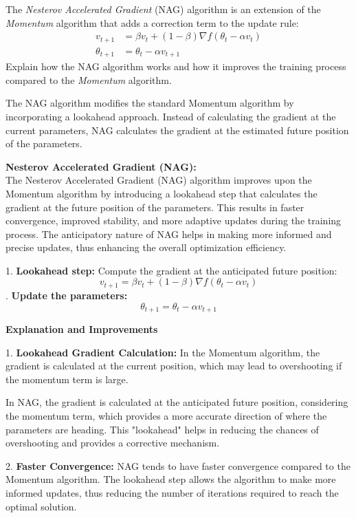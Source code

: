 The \textit{Nesterov Accelerated Gradient} (NAG) algorithm is an extension of the \textit{Momentum} algorithm that adds a correction term to the update rule:
\[
\begin{aligned}
v_{t+1} &= \beta v_t + (1 - \beta) \nabla f(\theta_t - \alpha v_t) \\
\theta_{t+1} &= \theta_t - \alpha v_{t+1}
\end{aligned}
\]
Explain how the NAG algorithm works and how it improves the training process compared to the \textit{Momentum} algorithm.
\begin{qsolve}
    \begin{qsolve}[]
        The NAG algorithm modifies the standard Momentum algorithm by incorporating a lookahead approach. Instead of calculating the gradient at the current parameters, NAG calculates the gradient at the estimated future position of the parameters.

\textbf{Nesterov Accelerated Gradient (NAG):} \\
The Nesterov Accelerated Gradient (NAG) algorithm improves upon the Momentum algorithm by introducing a lookahead step that calculates the gradient at the future position of the parameters. This results in faster convergence, improved stability, and more adaptive updates during the training process. The anticipatory nature of NAG helps in making more informed and precise updates, thus enhancing the overall optimization efficiency.

1. \textbf{Lookahead step:} Compute the gradient at the anticipated future position:
\[
v_{t+1} = \beta v_t + (1 - \beta) \nabla f(\theta_t - \alpha v_t)
\]
. \textbf{Update the parameters:}
\[
\theta_{t+1} = \theta_t - \alpha v_{t+1}
\]

\textbf{Explanation and Improvements}

1. \textbf{Lookahead Gradient Calculation:} In the Momentum algorithm, the gradient is calculated at the current position, which may lead to overshooting if the momentum term is large.

   In NAG, the gradient is calculated at the anticipated future position, considering the momentum term, which provides a more accurate direction of where the parameters are heading. This "lookahead" helps in reducing the chances of overshooting and provides a corrective mechanism.

2. \textbf{Faster Convergence:} NAG tends to have faster convergence compared to the Momentum algorithm. The lookahead step allows the algorithm to make more informed updates, thus reducing the number of iterations required to reach the optimal solution.


\end{qsolve}
\end{qsolve}
